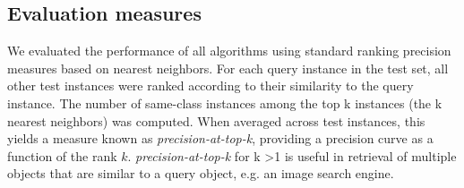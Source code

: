 \documentclass{article} %
\begin{document}
\begin{figure}[!h]
\begin{floatrow}
           \end{floatrow}
\end{figure}
     

\subsection{Evaluation measures}
We evaluated the performance of all algorithms using standard ranking precision measures based on nearest neighbors. For each query instance in the test set, all other test instances were ranked according to their similarity to the query instance. The number of same-class instances
among the top k instances (the k nearest neighbors) was computed. When averaged across test
instances, this yields a measure known as \textit{precision-at-top-k},
providing a precision curve as a function of the rank $k$. \textit{precision-at-top-k} for k >1 is useful in retrieval of multiple objects that are similar to a query object, e.g. an image search engine.
\end{document}
